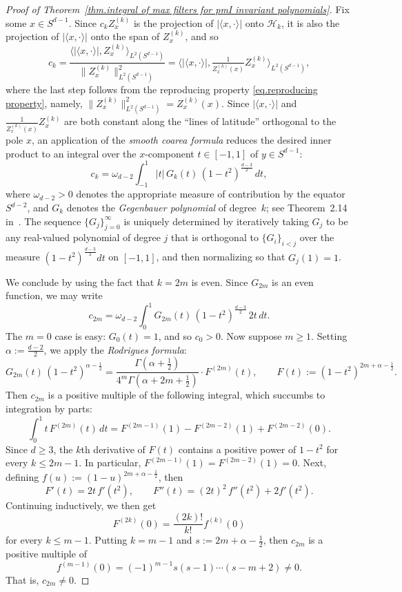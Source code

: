 \documentclass{article}
\theoremstyle{plain}
\theoremstyle{definition}
\begin{document}
\begin{proof}[Proof of Theorem~\ref{thm.integral of max filters for pmI invariant polynomials}]
Fix some $x \in S^{d-1}$.
Since $c_kZ_x^{(k)}$ is the projection of $|\langle x,\cdot\rangle|$ onto $\mathcal{H}_k$, it is also the projection of $|\langle x,\cdot\rangle|$ onto the span of $Z_x^{(k)}$, and so
\[
c_k
=\frac{\big\langle |\langle x,\cdot\rangle|,Z_x^{(k)}\big\rangle_{L^2(S^{d-1})}}{\|Z_x^{(k)}\|_{L^2(S^{d-1})}^2}
=\Big\langle |\langle x,\cdot\rangle|,\tfrac{1}{Z_x^{(k)}(x)}Z_x^{(k)}\Big\rangle_{L^2(S^{d-1})},
\]
where the last step follows from the reproducing property \eqref{eq.reproducing property}, namely, $\|Z_x^{(k)}\|_{L^2(S^{d-1})}^2=Z_x^{(k)}(x)$.
Since $|\langle x,\cdot\rangle|$ and $\tfrac{1}{Z_x^{(k)}(x)}Z_x^{(k)}$ are both constant along the ``lines of latitude'' orthogonal to the pole $x$, an application of the \textit{smooth coarea formula} reduces the desired inner product to an integral over the $x$-component $t\in[-1,1]$ of $y\in S^{d-1}$:
\[
c_k
=\omega_{d-2}\int_{-1}^1 |t|\, G_k(t)\, (1-t^2)^{\frac{d-3}{2}}\,dt,
\]
where $\omega_{d-2}>0$ denotes the appropriate measure of contribution by the equator $S^{d-2}$, and $G_k$ denotes the \textit{Gegenbauer polynomial} of degree~$k$; see Theorem~2.14 in~\cite[Chapter~IV]{SteinW:71}.
The sequence $\{G_j\}_{j=0}^\infty$ is uniquely determined by iteratively taking $G_j$ to be any real-valued polynomial of degree $j$ that is orthogonal to $\{G_i\}_{i<j}$ over the measure $(1-t^2)^{\frac{d-3}{2}}dt$ on $[-1,1]$, and then normalizing so that $G_j(1)=1$.

We conclude by using the fact that $k=2m$ is even.
Since $G_{2m}$ is an even function, we may write
\[
c_{2m}
=\omega_{d-2}\int_0^1 G_{2m}(t)\, (1-t^2)^{\frac{d-3}{2}}\,2t\,dt.
\]
The $m=0$ case is easy: $G_0(t)= 1$, and so $c_0>0$.
Now suppose $m\geq1$.
Setting $\alpha:=\frac{d-2}{2}$, we apply the \textit{Rodrigues formula}:
\[
G_{2m}(t)\, (1-t^2)^{\alpha-\frac{1}{2}}
=\frac{\Gamma(\alpha+\frac{1}{2})}{4^m\Gamma(\alpha+2m+\frac{1}{2})}\cdot F^{(2m)}(t),
\qquad
F(t):=(1-t^2)^{2m+\alpha-\frac{1}{2}}.
\]
Then $c_{2m}$ is a positive multiple of the following integral, which succumbs to integration by parts:
\[
\int_0^1 t\,F^{(2m)}(t)\,dt
=F^{(2m-1)}(1)-F^{(2m-2)}(1)+F^{(2m-2)}(0).
\]
Since $d\geq 3$, the $k$th derivative of $F(t)$ contains a positive power of $1-t^2$ for every $k\leq 2m-1$.
In particular, $F^{(2m-1)}(1)=F^{(2m-2)}(1)=0$.
Next, defining $f(u):=(1-u)^{2m+\alpha-\frac{1}{2}}$, then
\[
F'(t)
=2t\,f'(t^2),
\qquad
F''(t)
=(2t)^2\,f''(t^2)+2f'(t^2).
\]
Continuing inductively, we then get
\[
F^{(2k)}(0)
=\frac{(2k)!}{k!}f^{(k)}(0)
\]
for every $k\leq m-1$.
Putting $k=m-1$ and $s:=2m+\alpha-\frac{1}{2}$, then $c_{2m}$ is a positive multiple of
\[
f^{(m-1)}(0)
=(-1)^{m-1}s(s-1)\cdots(s-m+2)
\neq0.
\]
That is, $c_{2m}\neq0$.
\end{proof}
\end{document}
